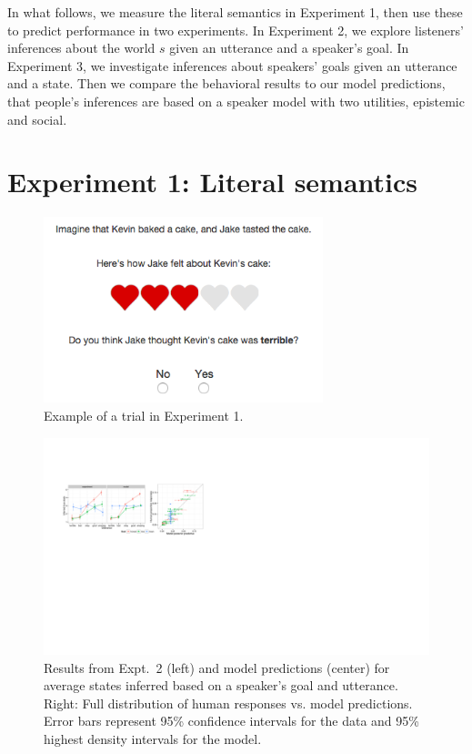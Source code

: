 \documentclass[10pt,letterpaper]{article}
\begin{document}
In what follows, we measure the literal semantics in Experiment 1, then use these to predict performance in two experiments. In Experiment 2, we explore listeners' inferences about the world $s$ given an utterance and a speaker's goal. In Experiment 3, we investigate inferences about speakers' goals given an utterance and a state. 
Then we compare the behavioral results to our model predictions, that people's inferences are based on a speaker model with two utilities, epistemic and social. 

\section{Experiment 1: Literal semantics}

\begin{figure}[th]
\begin{centering}
\includegraphics[width=3.2in]{figures/example.png}
\caption{\label{fig:ex} Example of a trial in Experiment 1.}
\end{centering}
\end{figure}


\begin{figure}[t]
\begin{centering}
\includegraphics[width=\textwidth]{figures/state-inference-wScatter.pdf}
\caption{\label{fig:exp3} Results from Expt.~2 (left) and model predictions (center) for average states inferred based on a speaker's goal and utterance. Right: Full distribution of human responses vs. model predictions. Error bars represent 95\% confidence intervals for the data and 95\% highest density intervals for the model.}
\end{centering}
\end{figure}
\end{document}
